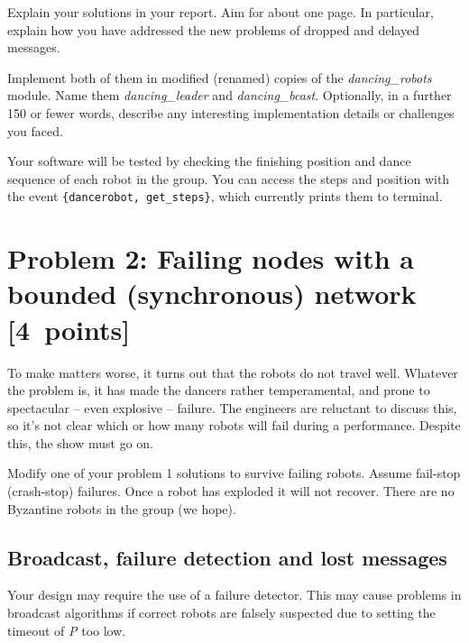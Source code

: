 \documentclass[a4paper]{article}
\begin{document}
Explain your solutions in your report. Aim for about one page.
In particular, explain how you have addressed the new
problems of dropped and delayed messages.

Implement both of them in modified (renamed) copies of the
\emph{dancing\_robots} module. Name them \emph{dancing\_leader} and
\emph{dancing\_bcast}. Optionally, in a further 150 or fewer words, describe any
interesting implementation details or challenges you faced.

Your software will be tested by checking the finishing position and dance
sequence of each robot in the group. You can access the steps and position
with the event \verb!{dancerobot, get_steps}!, which currently prints them
to terminal.












\section*{Problem 2: Failing nodes with a bounded (synchronous) network [4~points]} %
\label{sec:problem_2_failing_nodes}

To make matters worse, it turns out that the robots do not travel well.
Whatever the problem is, it has made the dancers rather temperamental, and
prone to spectacular -- even explosive -- failure. The engineers are reluctant
to discuss this, so it's not clear which or how many robots will fail during
a performance. Despite this, the show must go on.

Modify one of your problem 1 solutions to survive failing robots. Assume
fail-stop (crash-stop) failures. Once a robot has exploded it will not
recover. There are no Byzantine robots in the group (we hope).


\subsection*{Broadcast, failure detection and lost messages} %
\label{subsec:lost_messages}

Your design may require the use of a failure detector. This may cause problems
in broadcast algorithms if correct robots are falsely suspected due to setting
the timeout of \emph{P} too low.
\end{document}
